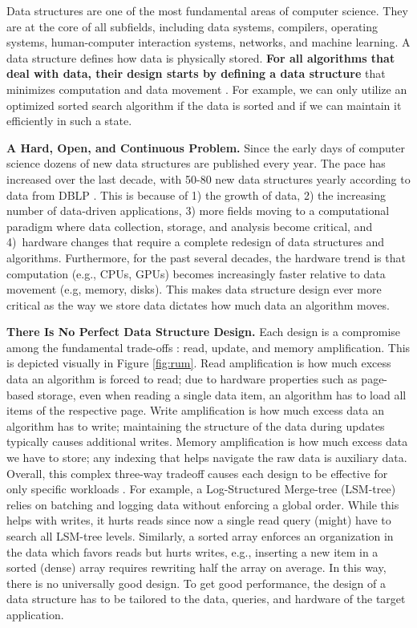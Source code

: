 \documentclass[11pt]{article}
\begin{document}
Data structures are one of the most fundamental areas of computer science. They are at the core of all subfields, including data systems, compilers, operating systems, human-computer interaction systems, networks, and machine learning. A data structure defines how data is physically stored. \textbf{For all algorithms that deal with data, their design starts by defining a data structure} that  minimizes computation and data movement \cite{Abadi2013, Athanassoulis2016, Hellerstein1995, Graefe2011, Kraska2018, Lehman1986, Yao1977, Yao1978, Dayan2016}. For example, we can only utilize an optimized sorted search algorithm if the data is sorted and if we can maintain it efficiently in such a state. 

\textbf{A Hard, Open, and Continuous Problem.} Since the early days of computer science dozens of new data structures are published every year. The pace has increased over the last decade, with 50-80 new data structures yearly according to data from DBLP \cite{dblp}. This is because of 1) the growth of data, 2) the increasing number of data-driven applications, 3) more fields moving to a computational paradigm where data collection, storage, and analysis become critical, and 4)~hardware changes that require a complete redesign of data structures and algorithms. Furthermore, for the past several decades, the hardware trend is that computation (e.g., CPUs, GPUs) becomes increasingly faster relative to data movement (e.g, memory, disks). This makes data structure design ever more critical as the way we store data dictates how much data an algorithm moves. 
  

\textbf{There Is No Perfect Data Structure Design.} Each design is a compromise among the fundamental trade-offs \cite{Athanassoulis2016}: read, update, and memory amplification. This is depicted visually in Figure \ref{fig:rum}. 
Read amplification is how much excess data an algorithm is forced to read; due to hardware properties such as page-based storage, even when reading a single data item, an algorithm has to load all items of the respective page. Write amplification is how much excess data an algorithm has to write; maintaining the structure of the data during updates typically causes additional writes. Memory amplification is how much excess data we have to store; any indexing that helps navigate the raw data is auxiliary data. Overall, this complex three-way tradeoff causes each design to be effective for only specific workloads \cite{Athanassoulis2016}. For example, a Log-Structured Merge-tree (LSM-tree) relies on batching and logging data without enforcing a global order. While this helps with writes, it hurts reads since now a single read query (might) have to search all LSM-tree levels.  Similarly, a sorted array enforces an organization in the data which favors reads but hurts writes, e.g., inserting a new item in a sorted (dense) array requires rewriting half the array on average. In this way, there is no universally good design. To get good performance, the design of a data structure has to be tailored to the data, queries, and hardware of the target application. 
 
\end{document}
